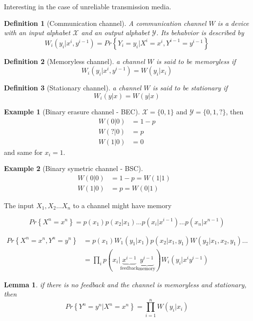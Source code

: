 \documentclass[twoside]{article}
\newtheorem{lemma}[theorem]{Lemma}
\newtheorem{definition}{Definition}[section]
\theoremstyle{definition} %
\newtheorem{example}{Example}
\renewcommand{\Pr}[1]{Pr\left\{#1\right\}}
\def\X{\mathcal{X}}
\def\Y{\mathcal{Y}}
\begin{document}
Interesting in the case of unreliable transmission media.

\begin{definition}[Communication channel]
  A communication channel $W$ is a device with an input alphabet $\X$ and an output
  alphabet $\Y$. Its behabvior is described by
  \[
    W_i(y_i | x^i, y^{i-1}) = \Pr{Y_i = y_i | X^i = x^i, Y^{i-1} = y^{i-1}}
  \]
\end{definition}

\begin{definition}[Memoryless channel]
  a channel $W$ is said to be memoryless if
  \[
      W_i(y_i | x^i, y^{i-1}) = W(y_i|x_i)
    \]
\end{definition}

\begin{definition}[Stationary channel]
  a channel $W$ is said to be stationary if
  \[
      W_i(y|x) = W(y|x)
    \]
\end{definition}

\begin{example}[Binary erasure channel - BEC]
  $\X = \{0,1\}$ and $\Y = \{0,1,?\}$, then
  \begin{align*}
    W(0|0) &= 1 - p\\
    W(?|0) &= p\\
    W(1|0) &= 0
  \end{align*}
  and same for $x_i=1$.
\end{example}

\begin{example}[Binary symetric channel - BSC]
  \begin{align*}
    W(0|0) &= 1 - p = W(1|1)&\\
    W(1|0) &= p =W(0|1)
  \end{align*}
\end{example}

The input $X_1, X_2 \dots X_n$ to a channel might have memory

\[
  \Pr{X^n = x^n} = p(x_1)p(x_2 | x_1) \dots p(x_i | x^{i-1}) \dots p(x_n|x^{n-1})
\]

\begin{align*}
  \Pr{X^n=x^n, Y^n=y^n} &= p(x_1)W_1(y_1|x_1)p(x_2|x_1,y_1)W(y_2|x_1,x_2,y_1)\dots\\
  &= \prod_i p(x_i|
  \underbrace{x^{i-1}}_{\text{feedback}}
  \underbrace{y^{i-1}}_{\text{memory}}
  )W_i(y_i|x^iy^{i-1})
\end{align*}

\begin{lemma}
  if there is no feedback and the channel is memoryless and stationary, then
  \[
    \Pr{Y^n=y^n | X^n=x^n} = \prod_{i=1}^n W(y_i|x_i)
  \]
\end{lemma}
\end{document}
